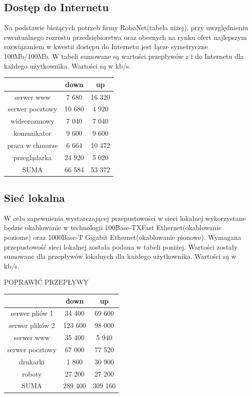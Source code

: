 \documentclass{article}
\begin{document}
\subsection{Dostęp do Internetu}
Na podstawie bieżących potrzeb firmy RoboNet(tabela niżej), przy uwzględnieniu ewentualnego rozrostu przedsiębiorstwa oraz obecnych na rynku ofert najlepszym rozwiązaniem w kwestii dostępu do Internetu jest łącze symetryczne 100Mb/100Mb.\newline
W tabeli sumowane są wartości przepływów z i do Internetu dla każdego użytkownika. Wartości są w kb/s.
\newline
\begin{tabular}{|c|c|c|} \hline
	& down & up \\
	\hline
	serwer www & 7 680 & 16 320\\
	serwer pocztowy & 10 680 & 4 920\\
	wideorozmowy & 7 040 & 7 040 \\
	komunikator & 9 600 & 9 600 \\
	praca w chmurze & 6 664 & 10 472 \\
	przeglądarka & 24 920 & 5 020 \\
	\hline
	\hline
	SUMA & 66 584 & 53 372\\
\hline
\end{tabular}
\subsection{Sieć lokalna}
W celu zapewnienia wystarczającej przepustowości w sieci lokalnej wykorzystane będzie okablowanie w technologii 100Base-TXFast Ethernet(okablowanie poziome) oraz 1000Base-T Gigabit Ethernet(okablowanie pionowe).  Wymagana przepustowość sieci lokalnej została podana w tabeli poniżej. Wartości zostały sumowane dla przepływów lokalnych dla każdego użytkownika. Wartości są w kb/s.

POPRAWIĆ PRZEPŁYWY


\begin{tabular}{|c|c|c|} \hline
	& down & up \\
	\hline
	serwer pliów 1 & 34 400 & 69 600\\
	serwer plików 2 & 123 600 & 98 000\\
	serwer www & 35 400 & 5 940\\
	serwer pocztowy & 67 000 & 77 520\\
	drukarki & 1 800 & 30 900\\
	roboty & 27 200 & 27 200\\
	\hline
	\hline
	SUMA & 289 400 & 309 160\\
	\hline
\end{tabular}
\newpage
\end{document}
